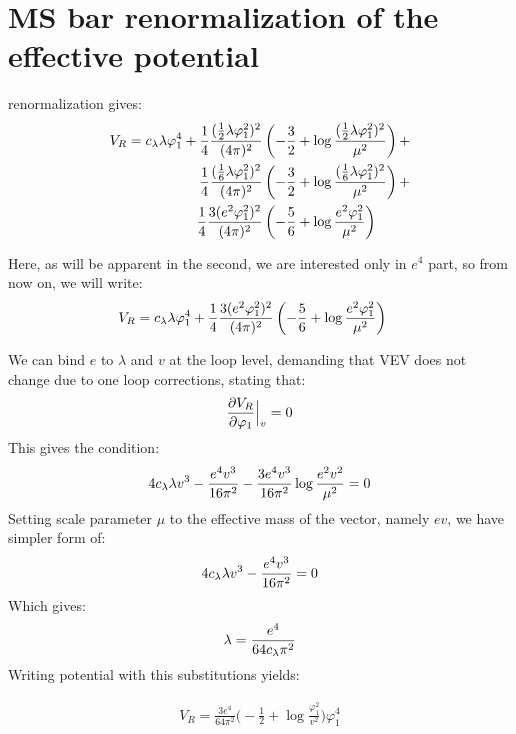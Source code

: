\chapter{MS bar renormalization of the effective potential}



\MSbar renormalization gives:
\begin{align}
V_{R}=c_\lambda\lambda\varphi_1^4 + \frac{1}{4}\frac{(\frac{1}{2}\lambda\varphi_1^2)^2}{(4\pi)^2}&\left(-\frac{3}{2}+ 
\log{\frac{(\frac{1}{2}\lambda\varphi_1^2)^2}{\mu^2}}\right) + \\
\frac{1}{4}\frac{(\frac{1}{6}\lambda\varphi_1^2)^2}{(4\pi)^2}&\left(-\frac{3}{2}+ 
\log{\frac{(\frac{1}{6}\lambda\varphi_1^2)^2}{\mu^2}}\right) + \\
\frac{1}{4}\frac{3(e^2\varphi_1^2)^2}{(4\pi)^2}&\left(-\frac{5}{6}+
\log{\frac{e^2\varphi_1^2}{\mu^2}}\right)
\end{align}

Here, as will be apparent in the second, we are interested only in $e^4$ part, so from now on, 
we will write:
\begin{align}
V_{R}=c_\lambda\lambda\varphi_1^4 + \frac{1}{4}\frac{3(e^2\varphi_1^2)^2}{(4\pi)^2}&\left(-\frac{5}{6}+
\log{\frac{e^2\varphi_1^2}{\mu^2}}\right)
\end{align}

We can bind $e$ to $\lambda$ and $v$ at the loop level, demanding that VEV does not change 
due to one loop corrections, stating that:
\begin{align}
\frac{\partial V_R}{\partial \varphi_1} \Big|_v= 0
\end{align}
This gives the condition:
\begin{align}
4c_\lambda\lambda v^3-\frac{e^4v^3}{16\pi^2}-\frac{3e^4v^3}{16\pi^2}\log\frac{e^2v^2}{\mu^2}=0
\end{align}
Setting scale parameter $\mu$ to the effective mass of the vector, namely $ev$, we have 
simpler form of:
\begin{align}
4c_\lambda\lambda v^3-\frac{e^4v^3}{16\pi^2}=0
\end{align}
Which gives:
\begin{align}\label{e4_lambda_MS}
\lambda = \frac{e^4}{64c_\lambda\pi^2}
\end{align}
Writing potential with this substitutions yields:

\begin{align}
V_R = \frac{3e^4}{64\pi^2}\Big(-\frac{1}{2}+\log\frac{\varphi_1^2}{v^2}\Big)\varphi_1^4
\end{align}


